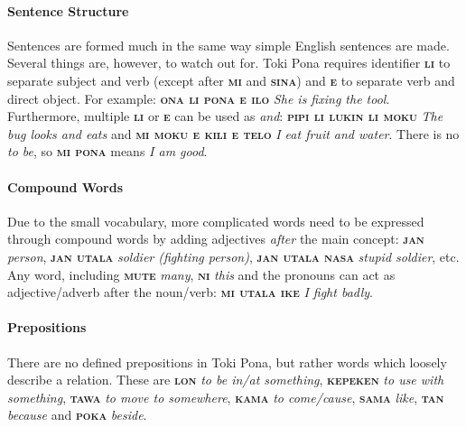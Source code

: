 \documentclass[10pt,a4paper]{article}
\begin{document}
\paragraph{Sentence Structure}

Sentences are formed much in the same way simple English sentences are made. Several things are, however, to watch out for. Toki Pona requires identifier \textbf{\textsc{li}} to separate subject and verb (except after \textbf{\textsc{mi}} and \textbf{\textsc{sina}}) and \textbf{\textsc{e}} to separate verb and direct object. For example: \textbf{\textsc{ona li pona e ilo}} \textit{She is fixing the tool}. Furthermore, multiple \textbf{\textsc{li}} or \textbf{\textsc{e}} can be used as \textit{and}: \textbf{\textsc{pipi li lukin li moku}} \textit{The bug looks and eats} and \textbf{\textsc{mi moku e kili e telo}} \textit{I eat fruit and water}. There is no \textit{to be}, so \textbf{\textsc{mi pona}} means \textit{I am good}.

\paragraph{Compound Words}

Due to the small vocabulary, more complicated words need to be expressed through compound words by adding adjectives \textit{after} the main concept: \textbf{\textsc{jan}} \textit{person}, \textbf{\textsc{jan utala}} \textit{soldier (fighting person)}, \textbf{\textsc{jan utala nasa}} \textit{stupid soldier}, etc. Any word, including \textbf{\textsc{mute}} \textit{many}, \textbf{\textsc{ni}} \textit{this} and the pronouns can act as adjective/adverb after the noun/verb: \textbf{\textsc{mi utala ike}} \textit{I fight badly}.

\paragraph{Prepositions}

There are no defined prepositions in Toki Pona, but rather words which loosely describe a relation. These are \textbf{\textsc{lon}} \textit{to be in/at something}, \textbf{\textsc{kepeken}} \textit{to use with something}, \textbf{\textsc{tawa}} \textit{to move to somewhere}, \textbf{\textsc{kama}} \textit{to come/cause}, \textbf{\textsc{sama}} \textit{like}, \textbf{\textsc{tan}} \textit{because} and \textbf{\textsc{poka}} \textit{beside}.
\end{document}
